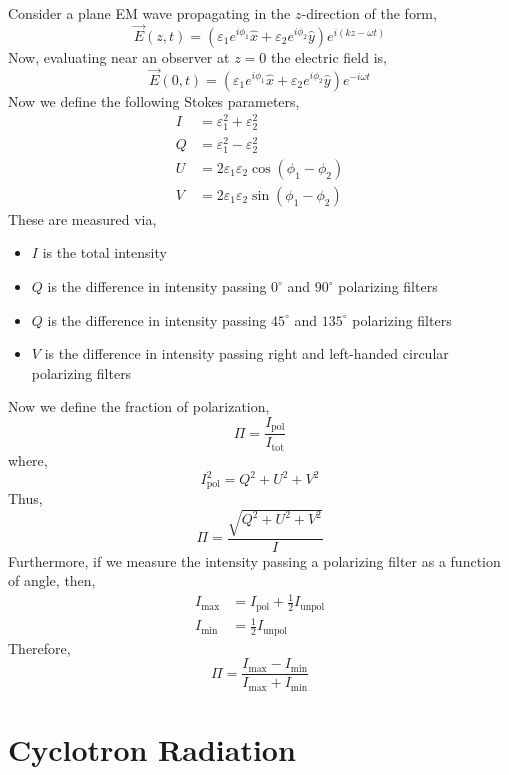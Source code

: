 \documentclass[11pt, a4paper]{article}
\begin{document}
Consider a plane EM wave propagating in the $z$-direction of the form,
\[ \vec{E}(z, t) = (\varepsilon_1 e^{i \phi_1} \hat{x} + \varepsilon_2 e^{i \phi_2} \hat{y}) e^{i (kz - \omega t)} \]
Now, evaluating near an observer at $z = 0$ the electric field is,
\[ \vec{E}(0, t) = (\varepsilon_1 e^{i \phi_1} \hat{x} + \varepsilon_2 e^{i \phi_2} \hat{y}) e^{-i\omega t} \] 
Now we define the following Stokes parameters,
\begin{align*}
I & = \varepsilon_1^2 + \varepsilon_2^2
\\
Q & = \varepsilon_1^2 - \varepsilon_2^2 
\\
U & = 2 \varepsilon_1 \varepsilon_2 \cos{(\phi_1 - \phi_2)}
\\
V & = 2 \varepsilon_1 \varepsilon_2 \sin{(\phi_1 - \phi_2)}
\end{align*}
These are measured via,
\begin{itemize}
\item $I$ is the total intensity
\item $Q$ is the difference in intensity passing $0^\circ$ and $90^\circ$ polarizing filters
\item $Q$ is the difference in intensity passing $45^\circ$ and $135^\circ$ polarizing filters 
\item $V$ is the difference in intensity passing right and left-handed circular polarizing filters
\end{itemize}
Now we define the fraction of polarization,
\[ \Pi = \frac{I_{\text{pol}}}{I_{\text{tot}}} \]
where,
\[ I_{\text{pol}}^2 = Q^2 + U^2 + V^2 \]
Thus,
\[ \Pi = \frac{\sqrt{Q^2 + U^2 + V^2}}{I} \]
Furthermore, if we measure the intensity passing a polarizing filter as a function of angle, then,
\begin{align*}
I_{\text{max}} & = I_{\text{pol}} + \tfrac{1}{2} I_{\text{unpol}} 
\\
I_{\text{min}} & = \tfrac{1}{2} I_{\text{unpol}}
\end{align*}
Therefore,
\[ \Pi = \frac{I_{\text{max}} - I_{\text{min}}}{I_{\text{max}} + I_{\text{min}}} \]


\section{Cyclotron Radiation}
\end{document}
